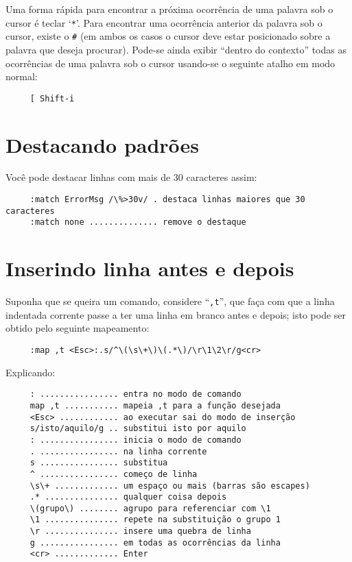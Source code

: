 {\Large {}} Uma forma rápida para encontrar a próxima ocorrência de uma
palavra sob o cursor é teclar `\verb|*|'. Para encontrar uma ocorrência anterior
da palavra sob o cursor, existe o \verb|#| (em ambos os casos o cursor deve
estar posicionado sobre a palavra que deseja procurar). Pode-se ainda exibir 
``dentro do contexto'' todas as ocorrências de uma palavra sob o cursor usando-se 
o seguinte atalho em modo normal:

\begin{verbatim}
     [ Shift-i
\end{verbatim}

\section{Destacando padrões}
\label{sec:Destacando padrões}
\vimhelp{\%>}

Você pode destacar linhas com mais de 30 caracteres assim:

\begin{verbatim}
     :match ErrorMsg /\%>30v/ . destaca linhas maiores que 30 caracteres
     :match none .............. remove o destaque
\end{verbatim}

\section{Inserindo linha antes e depois}

Suponha que se queira um comando, considere ``\verb|,t|'', que faça com que a
linha indentada corrente passe a ter uma linha em branco antes e depois; isto
pode ser obtido pelo seguinte mapeamento:

\begin{verbatim}
     :map ,t <Esc>:.s/^\(\s\+\)\(.*\)/\r\1\2\r/g<cr>
\end{verbatim}

Explicando:

\begin{verbatim}
     : ................ entra no modo de comando
     map ,t ........... mapeia ,t para a função desejada
     <Esc> ............ ao executar sai do modo de inserção
     s/isto/aquilo/g .. substitui isto por aquilo
     : ................ inicia o modo de comando
     . ................ na linha corrente
     s ................ substitua
     ^ ................ começo de linha
     \s\+ ............. um espaço ou mais (barras são escapes)
     .* ............... qualquer coisa depois
     \(grupo\) ........ agrupo para referenciar com \1
     \1 ............... repete na substituição o grupo 1
     \r ............... insere uma quebra de linha
     g ................ em todas as ocorrências da linha
     <cr> ............. Enter
\end{verbatim}

